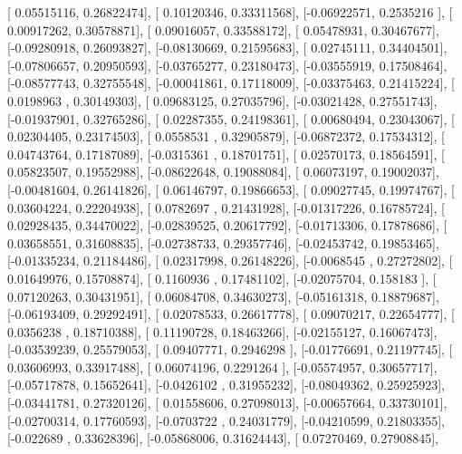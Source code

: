 \documentclass{article}
\begin{document}
       [ 0.05515116,  0.26822474],
       [ 0.10120346,  0.33311568],
       [-0.06922571,  0.2535216 ],
       [ 0.00917262,  0.30578871],
       [ 0.09016057,  0.33588172],
       [ 0.05478931,  0.30467677],
       [-0.09280918,  0.26093827],
       [-0.08130669,  0.21595683],
       [ 0.02745111,  0.34404501],
       [-0.07806657,  0.20950593],
       [-0.03765277,  0.23180473],
       [-0.03555919,  0.17508464],
       [-0.08577743,  0.32755548],
       [-0.00041861,  0.17118009],
       [-0.03375463,  0.21415224],
       [ 0.0198963 ,  0.30149303],
       [ 0.09683125,  0.27035796],
       [-0.03021428,  0.27551743],
       [-0.01937901,  0.32765286],
       [ 0.02287355,  0.24198361],
       [ 0.00680494,  0.23043067],
       [ 0.02304405,  0.23174503],
       [ 0.0558531 ,  0.32905879],
       [-0.06872372,  0.17534312],
       [ 0.04743764,  0.17187089],
       [-0.0315361 ,  0.18701751],
       [ 0.02570173,  0.18564591],
       [ 0.05823507,  0.19552988],
       [-0.08622648,  0.19088084],
       [ 0.06073197,  0.19002037],
       [-0.00481604,  0.26141826],
       [ 0.06146797,  0.19866653],
       [ 0.09027745,  0.19974767],
       [ 0.03604224,  0.22204938],
       [ 0.0782697 ,  0.21431928],
       [-0.01317226,  0.16785724],
       [ 0.02928435,  0.34470022],
       [-0.02839525,  0.20617792],
       [-0.01713306,  0.17878686],
       [ 0.03658551,  0.31608835],
       [-0.02738733,  0.29357746],
       [-0.02453742,  0.19853465],
       [-0.01335234,  0.21184486],
       [ 0.02317998,  0.26148226],
       [-0.0068545 ,  0.27272802],
       [ 0.01649976,  0.15708874],
       [ 0.1160936 ,  0.17481102],
       [-0.02075704,  0.158183  ],
       [ 0.07120263,  0.30431951],
       [ 0.06084708,  0.34630273],
       [-0.05161318,  0.18879687],
       [-0.06193409,  0.29292491],
       [ 0.02078533,  0.26617778],
       [ 0.09070217,  0.22654777],
       [ 0.0356238 ,  0.18710388],
       [ 0.11190728,  0.18463266],
       [-0.02155127,  0.16067473],
       [-0.03539239,  0.25579053],
       [ 0.09407771,  0.2946298 ],
       [-0.01776691,  0.21197745],
       [ 0.03606993,  0.33917488],
       [ 0.06074196,  0.2291264 ],
       [-0.05574957,  0.30657717],
       [-0.05717878,  0.15652641],
       [-0.0426102 ,  0.31955232],
       [-0.08049362,  0.25925923],
       [-0.03441781,  0.27320126],
       [ 0.01558606,  0.27098013],
       [-0.00657664,  0.33730101],
       [-0.02700314,  0.17760593],
       [-0.0703722 ,  0.24031779],
       [-0.04210599,  0.21803355],
       [-0.022689  ,  0.33628396],
       [-0.05868006,  0.31624443],
       [ 0.07270469,  0.27908845],
\end{document}
